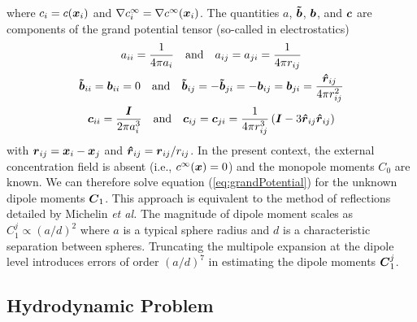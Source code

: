 \begin{appendices}
\begin{equation}
\end{equation}
where $c_i=c(\boldsymbol{x}_i)$ and $\nabla c^{\infty}_i=\nabla c^{\infty}(\boldsymbol{x}_i)$.  The quantities $a$, $\boldsymbol{\tilde{b}}$, $\boldsymbol{b}$, and $\boldsymbol{c}$ are components of the grand potential tensor (so-called in electrostatics\autocite{Bonnecaze1990})
\begin{gather}
    a_{ii} = \frac{1}{4\pi a_i} \quad \text{and} \quad  a_{ij} = a_{ji} = \frac{1}{4\pi r_{ij}}
    \\
    \boldsymbol{\tilde{b}}_{ii} = \boldsymbol{b}_{ii} = 0 \quad \text{and} \quad \boldsymbol{\tilde{b}}_{ij} = -\boldsymbol{\tilde{b}}_{ji} = -\boldsymbol{b}_{ij} = \boldsymbol{b}_{ji} = \frac{\boldsymbol{\hat{r}}_{ij}}{4\pi r_{ij}^2} 
    \\
    \boldsymbol{c}_{ii} = \frac{\boldsymbol{I}}{2\pi a_i^3} \quad \text{and} \quad \boldsymbol{c}_{ij} = \boldsymbol{c}_{ji} =  \frac{1}{4\pi r_{ij}^3} \left(\boldsymbol{I} - 3\boldsymbol{\hat{r}}_{ij}\boldsymbol{\hat{r}}_{ij}\right)
\end{gather}
with $\boldsymbol{r}_{ij} = \boldsymbol{x}_i - \boldsymbol{x}_j$ and $\boldsymbol{\hat{r}}_{ij} = \boldsymbol{r}_{ij}/ r_{ij}$.  In the present context, the external concentration field is absent (i.e., $c^{\infty}(\boldsymbol{x})=0$) and the monopole moments $C_0$ are known.  We can therefore solve equation (\ref{eq:grandPotential}) for the unknown dipole moments $\boldsymbol{C}_1$.  This approach is equivalent to the method of reflections detailed by Michelin \emph{et al.}\autocite{varma2018clustering}  The magnitude of dipole moment  scales as $C_1^j \propto (a/d)^2$ where $a$ is a typical sphere radius and $d$ is a characteristic separation between spheres. Truncating the multipole expansion at the dipole level introduces errors of order $(a/d)^7$ in estimating the dipole moments $\boldsymbol{C}_1^j$.    

\subsection{Hydrodynamic Problem}


\end{appendices}
